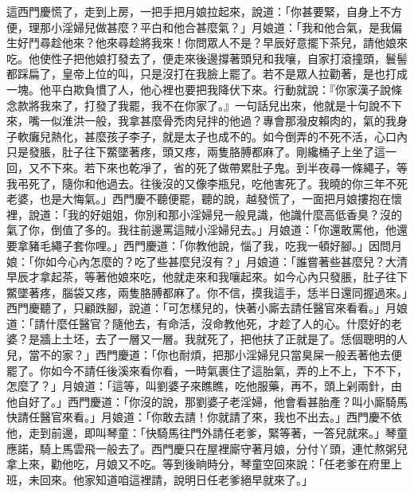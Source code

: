 這西門慶慌了，走到上房，一把手把月娘拉起來，說道：「你甚要緊，自身上不方便，理那小淫婦兒做甚麼？平白和他合甚麼氣？」月娘道：「我和他合氣，是我偏生好鬥尋趁他來？他來尋趁將我來！你問眾人不是？早辰好意擺下茶兒，請他娘來吃。他使性子把他娘打發去了，便走來後邊撐著頭兒和我嚷，自家打滾撞頭，鬟髻都踩扁了，皇帝上位的叫，只是沒打在我臉上罷了。若不是眾人拉勸著，是也打成一塊。他平白欺負慣了人，他心裡也要把我降伏下來。行動就說：『你家漢子說條念款將我來了，打發了我罷，我不在你家了。』一句話兒出來，他就是十句說不下來，嘴一似淮洪一般，我拿甚麼骨禿肉兒拌的他過？專會那潑皮賴肉的，氣的我身子軟癱兒熱化，甚麼孩子李子，就是太子也成不的。如今倒弄的不死不活，心口內只是發脹，肚子往下鱉墜著疼，頭又疼，兩隻胳膊都麻了。剛纔桶子上坐了這一回，又不下來。若下來也乾凈了，省的死了做帶累肚子鬼。到半夜尋一條繩子，等我弔死了，隨你和他過去。往後沒的又像李瓶兒，吃他害死了。我曉的你三年不死老婆，也是大悔氣。」西門慶不聽便罷，聽的說，越發慌了，一面把月娘摟抱在懷裡，說道：「我的好姐姐，你別和那小淫婦兒一般見識，他識什麼高低香臭？沒的氣了你，倒值了多的。我往前邊罵這賊小淫婦兒去。」月娘道：「你還敢罵他，他還要拿豬毛繩子套你哩。」西門慶道：「你教他說，惱了我，吃我一頓好腳。」因問月娘：「你如今心內怎麼的？吃了些甚麼兒沒有？」月娘道：「誰嘗著些甚麼兒？大清早辰才拿起茶，等著他娘來吃，他就走來和我嚷起來。如今心內只發脹，肚子往下鱉墜著疼，腦袋又疼，兩隻胳膊都麻了。你不信，摸我這手，恁半日還同握過來。」西門慶聽了，只顧跌腳，說道：「可怎樣兒的，快著小廝去請任醫官來看看。」月娘道：「請什麼任醫官？隨他去，有命活，沒命教他死，才趁了人的心。什麼好的老婆？是牆上土坯，去了一層又一層。我就死了，把他扶了正就是了。恁個聰明的人兒，當不的家？」西門慶道：「你也耐煩，把那小淫婦兒只當臭屎一般丟著他去便罷了。你如今不請任後溪來看你看，一時氣裹住了這胎氣，弄的上不上，下不下，怎麼了？」月娘道：「這等，叫劉婆子來瞧瞧，吃他服藥，再不，頭上剁兩針，由他自好了。」西門慶道：「你沒的說，那劉婆子老淫婦，他會看甚胎產？叫小廝騎馬快請任醫官來看。」月娘道：「你敢去請！你就請了來，我也不出去。」西門慶不依他，走到前邊，即叫琴童：「快騎馬往門外請任老爹，緊等著，一答兒就來。」琴童應諾，騎上馬雲飛一般去了。西門慶只在屋裡廝守著月娘，分付丫頭，連忙熬粥兒拿上來，勸他吃，月娘又不吃。等到後晌時分，琴童空回來說：「任老爹在府里上班，未回來。他家知道咱這裡請，說明日任老爹絕早就來了。」

